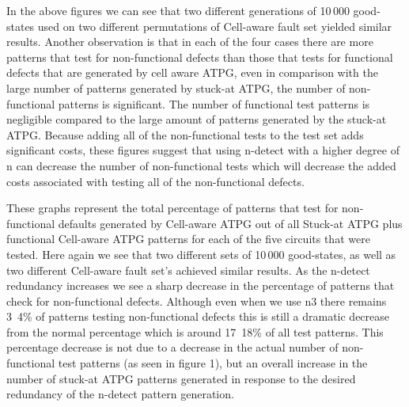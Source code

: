 







{}

In the above figures we can see that two different generations of 10\,000 good-states used on two different permutations of Cell-aware fault set yielded similar results. Another observation is that in each of the four cases there are more patterns that test for non-functional defects than those that tests for functional defects that are generated by cell aware ATPG, even in comparison with the large number of patterns generated by stuck-at ATPG, the number of non-functional patterns is significant. The number of functional test patterns is negligible compared to the large amount of patterns generated by the stuck-at ATPG. Because adding all of the non-functional tests to the test set adds significant costs, these figures suggest that using n-detect with a higher degree of n can decrease the number of non-functional tests which will decrease the added costs associated with testing all of the non-functional defects. 

These graphs represent the total percentage of patterns that test for non-functional defaults generated by Cell-aware ATPG out of all Stuck-at ATPG plus functional Cell-aware ATPG patterns for each of the five circuits that were tested. Here again we see that two different sets of 10\,000 good-states, as well as two different Cell-aware fault set's achieved similar results. As the n-detect redundancy increases we see a sharp decrease in the percentage of patterns that check for non-functional defects. Although even when we use n3 there remains 3~4\% of patterns testing non-functional defects this is still a dramatic decrease from the normal percentage which is around 17~18\% of all test patterns. This percentage decrease is not due to a decrease in the actual number of non-functional test patterns (as seen in figure 1), but an overall increase in the number of stuck-at ATPG patterns generated in response to the desired redundancy of the n-detect pattern generation. 

